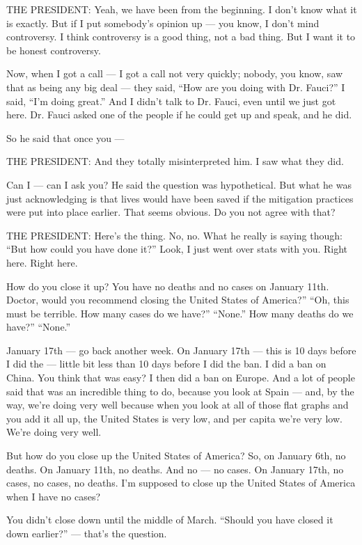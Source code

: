 THE PRESIDENT: Yeah, we have been from the beginning. I don't know what
it is exactly. But if I put somebody's opinion up --- you know, I don't
mind controversy. I think controversy is a good thing, not a bad thing.
But I want it to be honest controversy.

Now, when I got a call --- I got a call not very quickly; nobody, you
know, saw that as being any big deal --- they said, ``How are you doing
with Dr. Fauci?'' I said, ``I'm doing great.'' And I didn't talk to Dr.
Fauci, even until we just got here. Dr. Fauci asked one of the people if
he could get up and speak, and he did.

So he said that once you ---

THE PRESIDENT: And they totally misinterpreted him. I saw what they did.

Can I --- can I ask you? He said the question was hypothetical. But what
he was just acknowledging is that lives would have been saved if the
mitigation practices were put into place earlier. That seems obvious. Do
you not agree with that?

THE PRESIDENT: Here's the thing. No, no. What he really is saying
though: ``But how could you have done it?'' Look, I just went over stats
with you. Right here. Right here.

How do you close it up? You have no deaths and no cases on January 11th.
Doctor, would you recommend closing the United States of America?''
``Oh, this must be terrible. How many cases do we have?'' ``None.'' How
many deaths do we have?'' ``None.''

January 17th --- go back another week. On January 17th --- this is 10
days before I did the --- little bit less than 10 days before I did the
ban. I did a ban on China. You think that was easy? I then did a ban on
Europe. And a lot of people said that was an incredible thing to do,
because you look at Spain --- and, by the way, we're doing very well
because when you look at all of those flat graphs and you add it all up,
the United States is very low, and per capita we're very low. We're
doing very well.

But how do you close up the United States of America? So, on January
6th, no deaths. On January 11th, no deaths. And no --- no cases. On
January 17th, no cases, no cases, no deaths. I'm supposed to close up
the United States of America when I have no cases?

You didn't close down until the middle of March. ``Should you have
closed it down earlier?'' --- that's the question.


